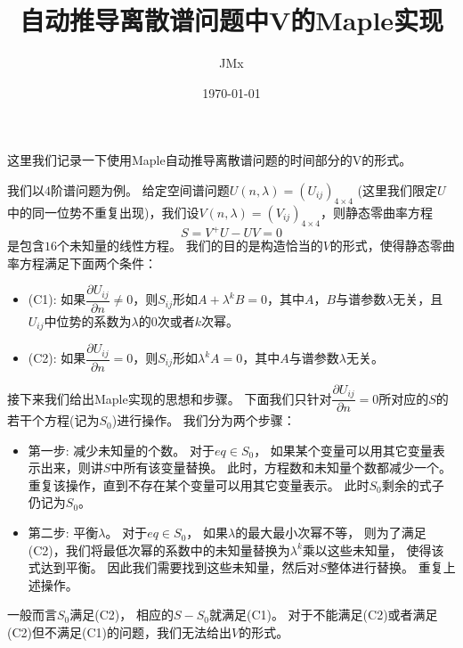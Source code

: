 \documentclass[12pt,a4paper,hyperref]{ctexrep}
\title{自动推导离散谱问题中V的Maple实现}
\author{JMx}
\date{\today}
\begin{document}
	\maketitle
	
这里我们记录一下使用Maple自动推导离散谱问题的时间部分的V的形式。

我们以$4$阶谱问题为例。 给定空间谱问题$U(n, \lambda)=(U_{ij})_{4\times 4}$ (这里我们限定$U$中的同一位势不重复出现)，我们设$V(n, \lambda)=(V_{ij})_{4\times 4}$，则静态零曲率方程
\begin{equation}
	S=V^+U - UV = 0
\end{equation}
是包含$16$个未知量的线性方程。 
我们的目的是构造恰当的$V$的形式，使得静态零曲率方程满足下面两个条件：
{\color{blue}
\begin{itemize}
\item (C1): 如果$ \dfrac{\partial U_{ij}}{\partial n}\neq 0$，则$S_{ij}$形如$A+\lambda^k B=0$，其中$A，B$与谱参数$ \lambda$无关，且$U_{ij}$中位势的系数为$\lambda$的$0$次或者$k$次幂。

\item (C2): 如果$ \dfrac{\partial U_{ij}}{\partial n}= 0$，则$S_{ij}$形如$\lambda^k A=0$，其中$A$与谱参数$\lambda$无关。
\end{itemize}
}

接下来我们给出Maple实现的思想和步骤。 下面我们只针对$ \dfrac{\partial U_{ij}}{\partial n}= 0$所对应的$S$的若干个方程(记为$S_0$)进行操作。 我们分为两个步骤： 
{\color{blue}
\begin{itemize}
\item 第一步: 减少未知量的个数。 对于$eq\in S_0$， 如果某个变量可以用其它变量表示出来，则讲$S$中所有该变量替换。 此时，方程数和未知量个数都减少一个。 重复该操作，直到不存在某个变量可以用其它变量表示。 此时$S_0$剩余的式子仍记为$S_0$。

\item 第二步: 平衡$\lambda$。 对于$eq\in S_0$， 如果$\lambda$的最大最小次幂不等， 则为了满足(C2)，我们将最低次幂的系数中的未知量替换为$\lambda^k$乘以这些未知量， 使得该式达到平衡。 因此我们需要找到这些未知量，然后对$S$整体进行替换。 重复上述操作。
\end{itemize}
}
一般而言$S_0$满足(C2)， 相应的$S-S_0$就满足(C1)。 对于不能满足(C2)或者满足(C2)但不满足(C1)的问题，我们无法给出$V$的形式。
\end{document}
